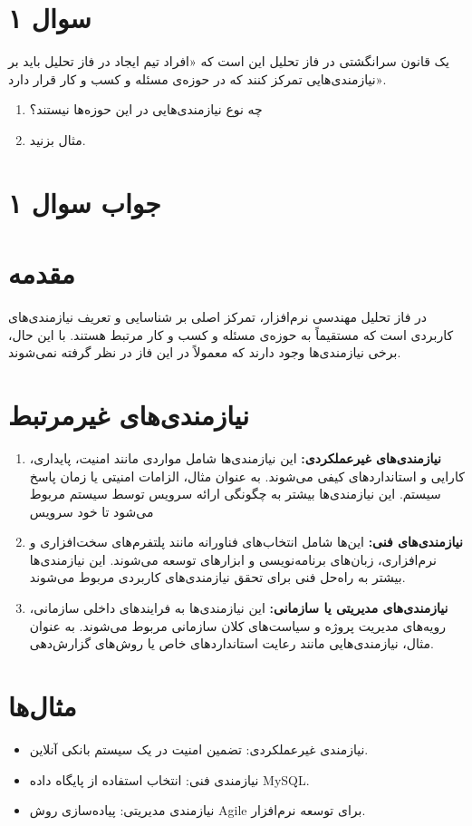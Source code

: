 \section*{سوال ۱}

یک قانون سرانگشتی در فاز تحلیل این است که «افراد تیم ایجاد در فاز تحلیل باید بر نیازمندی‌هایی تمرکز کنند که در حوزه‌ی مسئله و کسب و کار قرار دارد».
\begin{enumerate}
	\item چه نوع نیازمندی‌هایی در این حوزه‌ها نیستند؟
	\item مثال بزنید.
\end{enumerate}

\section*{جواب سوال ۱}


\section*{مقدمه}
در فاز تحلیل مهندسی نرم‌افزار، تمرکز اصلی بر شناسایی و تعریف نیازمندی‌های کاربردی است که مستقیماً به حوزه‌ی مسئله و کسب و کار مرتبط هستند. با این حال، برخی نیازمندی‌ها وجود دارند که معمولاً در این فاز در نظر گرفته نمی‌شوند.

\section*{نیازمندی‌های غیرمرتبط}
\begin{enumerate}
	\item \textbf{نیازمندی‌های غیرعملکردی:} این نیازمندی‌ها شامل مواردی مانند امنیت، پایداری، کارایی و استانداردهای کیفی می‌شوند. به عنوان مثال، الزامات امنیتی یا زمان پاسخ سیستم. این نیازمندی‌ها بیشتر به چگونگی ارائه سرویس توسط سیستم مربوط می‌شود تا خود سرویس
	
	\item \textbf{نیازمندی‌های فنی:} این‌ها شامل انتخاب‌های فناورانه مانند پلتفرم‌های سخت‌افزاری و نرم‌افزاری، زبان‌های برنامه‌نویسی و ابزارهای توسعه می‌شوند. این نیازمندی‌ها بیشتر به راه‌حل فنی برای تحقق نیازمندی‌های کاربردی مربوط می‌شوند.
	
	\item \textbf{نیازمندی‌های مدیریتی یا سازمانی:} این نیازمندی‌ها به فرایندهای داخلی سازمانی، رویه‌های مدیریت پروژه و سیاست‌های کلان سازمانی مربوط می‌شوند. به عنوان مثال، نیازمندی‌هایی مانند رعایت استانداردهای خاص یا روش‌های گزارش‌دهی.
\end{enumerate}

\section*{مثال‌ها}
\begin{itemize}
	\item نیازمندی غیرعملکردی: تضمین امنیت در یک سیستم بانکی آنلاین.
	\item نیازمندی فنی: انتخاب استفاده از پایگاه داده MySQL.
	\item نیازمندی مدیریتی: پیاده‌سازی روش Agile برای توسعه نرم‌افزار.
\end{itemize}